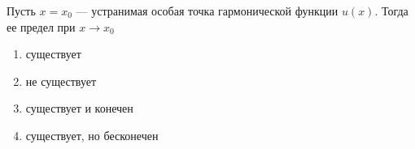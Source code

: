 Пусть \(x = x_0\) — устранимая особая точка гармонической функции \(u(x)\). Тогда ее предел при \(x \to x_0\)

\begin{enumerate}[label=\arabic*)]
    \item существует
    \item не существует
    \item существует и конечен
    \item существует, но бесконечен
\end{enumerate}

